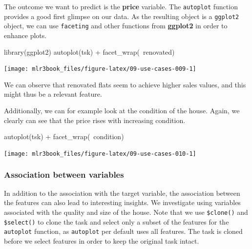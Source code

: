 \documentclass[
  11pt,
  parskip=half,
  DIV=calc,
  BCOR=10mm,
  x11names]{scrbook}
\newenvironment{Shaded}{}{}
\newcommand{\KeywordTok}[1]{\textcolor[rgb]{0.00,0.00,1.00}{#1}}
\newcommand{\NormalTok}[1]{#1}
\newcommand{\OperatorTok}[1]{#1}
\newcommand{\StringTok}[1]{\textcolor[rgb]{0.00,0.50,0.50}{#1}}
\begin{document}
The outcome we want to predict is the \textbf{price} variable.
The \texttt{autoplot} function provides a good first glimpse on our data.
As the resulting object is a \texttt{ggplot2} object, we can use \texttt{faceting} and other functions from \textbf{ggplot2} in order to enhance plots.

\begin{Shaded}
\begin{Highlighting}[]
\KeywordTok{library}\NormalTok{(ggplot2)}
\KeywordTok{autoplot}\NormalTok{(tsk) }\OperatorTok{+}\StringTok{ }\KeywordTok{facet_wrap}\NormalTok{(}\OperatorTok{~}\NormalTok{renovated)}
\end{Highlighting}
\end{Shaded}

\begin{center}\texttt{[image: mlr3book\_files/figure-latex/09-use-cases-009-1]} \end{center}

We can observe that renovated flats seem to achieve higher sales values, and this might thus be a relevant feature.

Additionally, we can for example look at the condition of the house.
Again, we clearly can see that the price rises with increasing condition.

\begin{Shaded}
\begin{Highlighting}[]
\KeywordTok{autoplot}\NormalTok{(tsk) }\OperatorTok{+}\StringTok{ }\KeywordTok{facet_wrap}\NormalTok{(}\OperatorTok{~}\NormalTok{condition)}
\end{Highlighting}
\end{Shaded}

\begin{center}\texttt{[image: mlr3book\_files/figure-latex/09-use-cases-010-1]} \end{center}

\hypertarget{association-between-variables}{%
\subsubsection{Association between variables}\label{association-between-variables}}

In addition to the association with the target variable, the association between the features can also lead to interesting insights.
We investigate using variables associated with the quality and size of the house.
Note that we use \texttt{\$clone()} and \texttt{\$select()} to clone the task and select only a subset of the features for the \texttt{autoplot} function, as \texttt{autoplot} per default uses all features.
The task is cloned before we select features in order to keep the original task intact.
\end{document}

